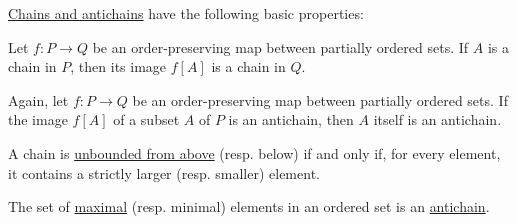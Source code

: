 \begin{proposition}\label{thm:def:partial_order_connectedness}
  \hyperref[thm:def:partial_order_connectedness]{Chains and antichains} have the following basic properties:
  \begin{thmenum}
     Let \( f: P \to Q \) be an order-preserving map between partially ordered sets. If \( A \) is a chain in \( P \), then its image \( f[A] \) is a chain in \( Q \).

     Again, let \( f: P \to Q \) be an order-preserving map between partially ordered sets. If the image \( f[A] \) of a subset \( A \) of \( P \) is an antichain, then \( A \) itself is an antichain.

     A chain is \hyperref[def:extremal_points/bounds]{unbounded from above} (resp. below) if and only if, for every element, it contains a strictly larger (resp. smaller) element.

     The set of \hyperref[def:extremal_points/maximal_and_minimal_element]{maximal} (resp. minimal) elements in an ordered set is an \hyperref[def:partial_order_connectedness/antichain]{antichain}.
  \end{thmenum}
\end{proposition}
